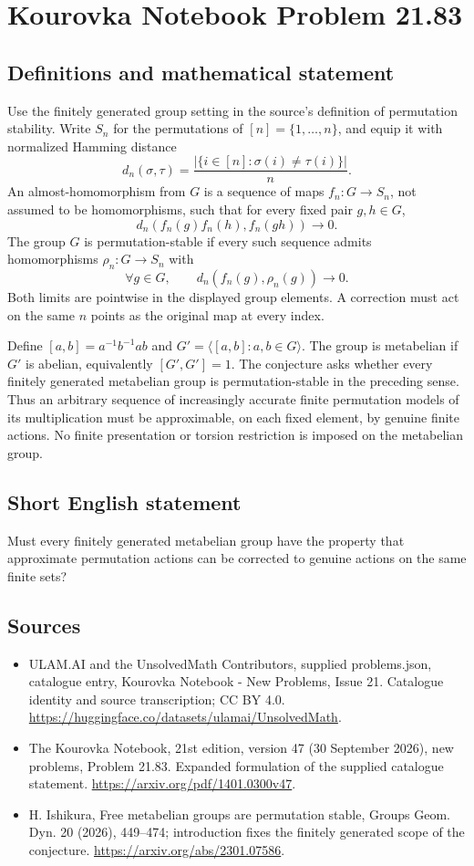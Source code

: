 \documentclass[11pt,a4paper]{article}
\begin{document}
\section*{Kourovka Notebook Problem 21.83}\label{statement}

\subsection{Definitions and mathematical statement}
Use the finitely generated group setting in the source's definition of permutation stability. Write $S_n$ for the permutations of $[n]=\{1,\ldots,n\}$, and equip it with normalized Hamming distance
\[
 d_n(\sigma,\tau)=\frac{|\{i\in[n]:\sigma(i)\ne\tau(i)\}|}{n}.
\]
An almost-homomorphism from $G$ is a sequence of maps $f_n:G\to S_n$, not assumed to be homomorphisms, such that for every fixed pair $g,h\in G$,
\[
 d_n(f_n(g)f_n(h),f_n(gh))\longrightarrow0.
\]
The group $G$ is permutation-stable if every such sequence admits homomorphisms $\rho_n:G\to S_n$ with
\[
 \forall g\in G,\qquad d_n(f_n(g),\rho_n(g))\longrightarrow0.
\]
Both limits are pointwise in the displayed group elements. A correction must act on the same $n$ points as the original map at every index.

Define $[a,b]=a^{-1}b^{-1}ab$ and $G'=\langle[a,b]:a,b\in G\rangle$. The group is metabelian if $G'$ is abelian, equivalently $[G',G']=1$. The conjecture asks whether every finitely generated metabelian group is permutation-stable in the preceding sense. Thus an arbitrary sequence of increasingly accurate finite permutation models of its multiplication must be approximable, on each fixed element, by genuine finite actions. No finite presentation or torsion restriction is imposed on the metabelian group.
\subsection{Short English statement}
Must every finitely generated metabelian group have the property that approximate permutation actions can be corrected to genuine actions on the same finite sets?
\subsection{Sources}
\begin{itemize}
\item[S1] ULAM.AI and the UnsolvedMath Contributors, supplied problems.json, catalogue entry, Kourovka Notebook - New Problems, Issue 21. Catalogue identity and source transcription; CC BY 4.0.
\url{https://huggingface.co/datasets/ulamai/UnsolvedMath}.
\item[S2] The Kourovka Notebook, 21st edition, version 47 (30 September 2026), new problems, Problem 21.83. Expanded formulation of the supplied catalogue statement.
\url{https://arxiv.org/pdf/1401.0300v47}.
\item[S3] H. Ishikura, Free metabelian groups are permutation stable, Groups Geom. Dyn. 20 (2026), 449--474; introduction fixes the finitely generated scope of the conjecture.
\url{https://arxiv.org/abs/2301.07586}.
\end{itemize}
\end{document}
